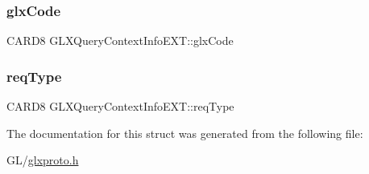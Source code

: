\subsubsection{\texorpdfstring{glx\+Code}{glxCode}}
{\footnotesize\ttfamily C\+A\+R\+D8 G\+L\+X\+Query\+Context\+Info\+E\+X\+T\+::glx\+Code}

\mbox{\label{struct_g_l_x_query_context_info_e_x_t_aa6ece1caed2f82884de9bdd48684bdf8}} 
\subsubsection{\texorpdfstring{req\+Type}{reqType}}
{\footnotesize\ttfamily C\+A\+R\+D8 G\+L\+X\+Query\+Context\+Info\+E\+X\+T\+::req\+Type}



The documentation for this struct was generated from the following file\+:\begin{DoxyCompactItemize}
\item 
G\+L/\hyperlink{glxproto_8h}{glxproto.\+h}\end{DoxyCompactItemize}
